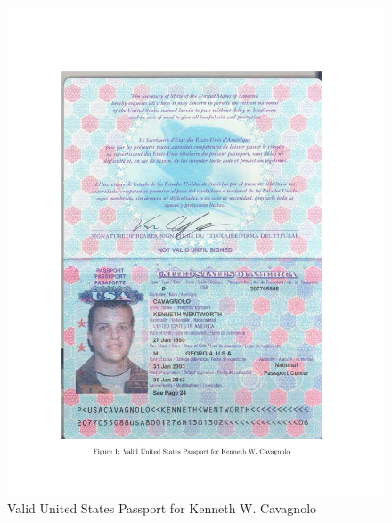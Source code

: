 \documentclass[11pt]{article}
\begin{document}
\begin{figure}[t]
  \centering
  \begin{minipage}[t]{0.9\linewidth}
    \includegraphics*[width=\textwidth]{passport}
    \caption{Valid United States Passport for Kenneth W. Cavagnolo}
  \end{minipage}
\end{figure}
\end{document}
